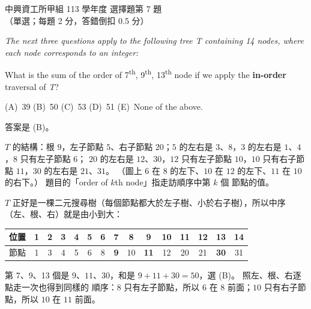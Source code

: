 \begin{pastexam}[label={px:nchu-113-dsa-07}]{中興資工所甲組 113 學年度 選擇題第 7 題}
（單選；每題 2 分，答錯倒扣 0.5 分）

\textit{The next three questions apply to the following tree T containing 14 nodes, where each node
corresponds to an integer:}

\begin{center}
\end{center}

What is the sum of the order of 7\textsuperscript{th}, 9\textsuperscript{th}, 13\textsuperscript{th} node if we apply the \textbf{in-order} traversal of \textit{T}?

(A)~39 \qquad (B)~50 \qquad (C)~53 \qquad (D)~51 \qquad (E)~None of the above.
\end{pastexam}

\begin{pastsoln}
答案是 (B)。

$T$ 的結構：根 $9$，左子節點 $5$、右子節點 $20$；$5$ 的左右是 $3$、$8$，$3$ 的左右是 $1$、$4$，$8$ 只有左子節點 $6$；
$20$ 的左右是 $12$、$30$，$12$ 只有左子節點 $10$，$10$ 只有右子節點 $11$，$30$ 的左右是 $21$、$31$。 （圖上 $6$
在 $8$ 的左下、$10$ 在 $12$ 的左下、$11$ 在 $10$ 的右下。） 題目的「order of $k$th node」指走訪順序中第 $k$ 個
節點的值。

$T$ 正好是一棵二元搜尋樹（每個節點都大於左子樹、小於右子樹），所以中序（左、根、右）就是由小到大：
\begin{center}
\small
\begin{tabular}{l*{14}{c}}
\toprule
位置 & 1 & 2 & 3 & 4 & 5 & 6 & 7 & 8 & 9 & 10 & 11 & 12 & 13 & 14 \\
\midrule
節點 & 1 & 3 & 4 & 5 & 6 & 8 & \textbf{9} & 10 & \textbf{11} & 12 & 20 & 21 & \textbf{30} & 31 \\
\bottomrule
\end{tabular}
\end{center}
第 7、9、13 個是 $9$、$11$、$30$，和是 $9 + 11 + 30 = 50$，選 (B)。 照左、根、右逐點走一次也得到同樣的
順序：$8$ 只有左子節點，所以 $6$ 在 $8$ 前面；$10$ 只有右子節點，所以 $10$ 在 $11$ 前面。
\end{pastsoln}
